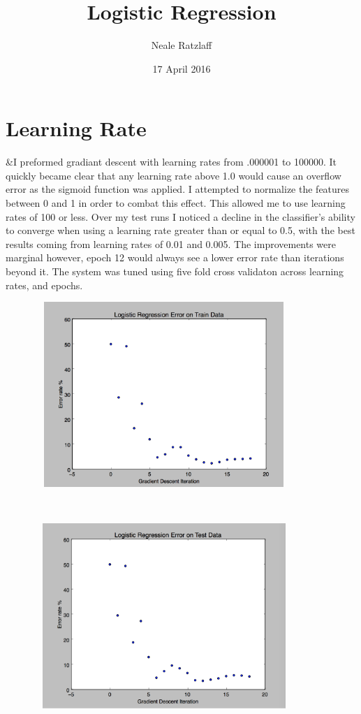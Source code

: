 \documentclass[letterpaper,10pt,titlepage]{article}
\title{Logistic Regression}
\author{Neale Ratzlaff}
\date{17 April 2016}
\begin{document}
\maketitle
\pagebreak

\section{Learning Rate}

    &I preformed gradiant descent with learning rates from .000001 to 100000. It quickly became clear that any learning rate above 1.0 would cause an overflow error as the sigmoid function was applied. 
    I attempted to normalize the features between 0 and 1 in order to combat this effect. This allowed me to use learning rates of 100 or less.
    Over my test runs I noticed a decline in the classifier's ability to converge when using a learning rate greater than or equal to 0.5, with the best results coming from learning rates of 0.01 and 0.005. 
    The improvements were marginal however, epoch 12 would always see a lower error rate than iterations beyond it. The system was tuned using five fold cross validaton across learning rates, and epochs. 
    
    \centerline{\includegraphics[width=12cm, height=7cm]{rates_train} }\\
    \centerline{\includegraphics[width=12cm, height=7cm]{rates_test} }
\end{document}
